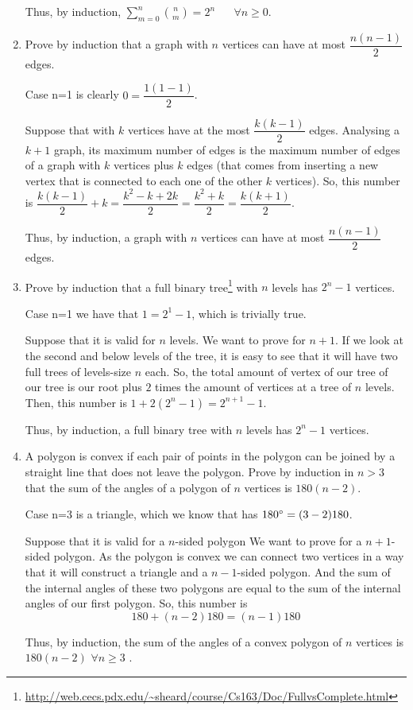 \documentclass{article}
\begin{document}
\begin{enumerate}
  Thus, by induction, \(\sum_{m=0}^{n}{n \choose m}=2^n \hspace{20pt} \forall n \geq 0\).
  \\
  
  \item Prove by induction that a graph with $n$ vertices can have at most  $\dfrac{n(n-1)}{2}$ edges.
  
  Case n=1 is clearly $0=\dfrac{1(1-1)}{2}$.
  
  Suppose that with $k$ vertices have at the most $\dfrac{k(k-1)}{2}$ edges. Analysing a $k+1$ graph, its maximum number of edges is the maximum number of edges of a graph with $k$ vertices plus $k$ edges (that comes from inserting a new vertex that is connected to each one of the other $k$ vertices). So, this number is $\dfrac{k(k-1)}{2}+k = \dfrac{k^2-k+2k}{2} = \dfrac{k^2+k}{2} = \dfrac{k(k+1)}{2}$.

  
  Thus, by induction, a graph with $n$ vertices can have at most  $\dfrac{n(n-1)}{2}$ edges.
  \\
  
  \item Prove by induction that a full binary tree\footnote{\url{http://web.cecs.pdx.edu/~sheard/course/Cs163/Doc/FullvsComplete.html}} with $n$ levels has $2^n-1$ vertices.
   
  Case n=1 we have that $1 = 2^1-1$, which is trivially true.
 
  Suppose that it is valid for $n$ levels. We want to prove for $n+1$.
  If we look at the second and below levels of the tree, it is easy to see that it will have two full trees of levels-size $n$ each. So, the total amount of vertex of our tree of our tree is our root plus $2$ times the amount of vertices at a tree of $n$ levels. Then, this number is $1+2(2^n-1)=2^{n+1}-1$.
  
  
  Thus, by induction, a full binary tree with $n$ levels has $2^n-1$ vertices.
  \\
  
  
  \item A polygon is convex if each pair of points in the polygon can be joined by a straight line that does not leave the polygon. Prove by induction in $n>3$ that the sum of the angles of a polygon of $n$ vertices is $180(n-2)$.
  
  Case n=3 is a triangle, which we know that has $180\degree = (3-2)180$.
  
  
  Suppose that it is valid for a $n$-sided polygon  We want to prove for a $n+1$-sided polygon. 
  As the polygon is convex we can connect two vertices in a way that it will construct a triangle and a $n-1$-sided polygon. And the sum of the internal angles of these two polygons are equal to the sum of the internal angles of our first polygon. So, this number is 
  \[180 + (n-2)180 = (n-1)180\]
  
  Thus, by induction, the sum of the angles of a convex polygon of $n$ vertices is $180(n-2)$ $\forall n\geq 3$ .
  \\
  
  
\end{enumerate}
\end{document}
